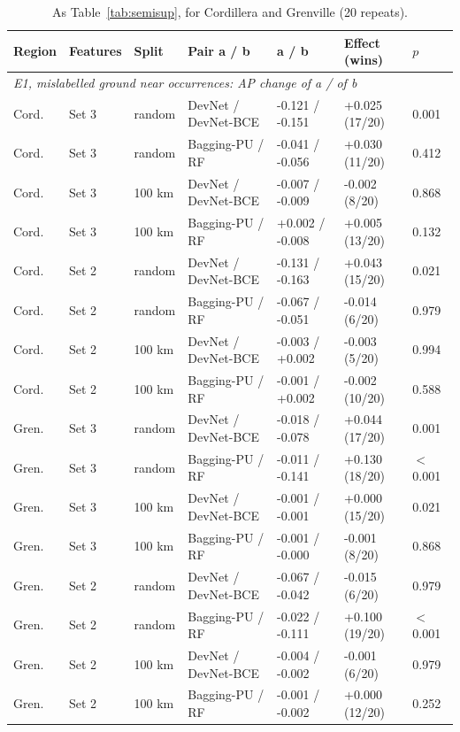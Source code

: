 \documentclass[pdflatex,sn-apa]{sn-jnl}
\begin{document}
\begin{appendices}
\begin{table}[!h]
\caption{As Table~\ref{tab:semisup}, for Cordillera and Grenville (20 repeats).}\label{tab:semisup-regions}
\scriptsize
\setlength{\tabcolsep}{2pt}
\begin{tabular*}{\textwidth}{@{\extracolsep\fill}lllllll}
\toprule
Region & Features & Split & Pair a / b & a / b & Effect (wins) & $p$ \\
\midrule
\multicolumn{7}{l}{\textit{E1, mislabelled ground near occurrences: AP change of a / of b}} \\
Cord. & Set 3 & random & DevNet / DevNet-BCE & -0.121 / -0.151 & +0.025 (17/20) & 0.001 \\
Cord. & Set 3 & random & Bagging-PU / RF & -0.041 / -0.056 & +0.030 (11/20) & 0.412 \\
Cord. & Set 3 & 100 km & DevNet / DevNet-BCE & -0.007 / -0.009 & -0.002 (8/20) & 0.868 \\
Cord. & Set 3 & 100 km & Bagging-PU / RF & +0.002 / -0.008 & +0.005 (13/20) & 0.132 \\
Cord. & Set 2 & random & DevNet / DevNet-BCE & -0.131 / -0.163 & +0.043 (15/20) & 0.021 \\
Cord. & Set 2 & random & Bagging-PU / RF & -0.067 / -0.051 & -0.014 (6/20) & 0.979 \\
Cord. & Set 2 & 100 km & DevNet / DevNet-BCE & -0.003 / +0.002 & -0.003 (5/20) & 0.994 \\
Cord. & Set 2 & 100 km & Bagging-PU / RF & -0.001 / +0.002 & -0.002 (10/20) & 0.588 \\
Gren. & Set 3 & random & DevNet / DevNet-BCE & -0.018 / -0.078 & +0.044 (17/20) & 0.001 \\
Gren. & Set 3 & random & Bagging-PU / RF & -0.011 / -0.141 & +0.130 (18/20) & $<$0.001 \\
Gren. & Set 3 & 100 km & DevNet / DevNet-BCE & -0.001 / -0.001 & +0.000 (15/20) & 0.021 \\
Gren. & Set 3 & 100 km & Bagging-PU / RF & -0.001 / -0.000 & -0.001 (8/20) & 0.868 \\
Gren. & Set 2 & random & DevNet / DevNet-BCE & -0.067 / -0.042 & -0.015 (6/20) & 0.979 \\
Gren. & Set 2 & random & Bagging-PU / RF & -0.022 / -0.111 & +0.100 (19/20) & $<$0.001 \\
Gren. & Set 2 & 100 km & DevNet / DevNet-BCE & -0.004 / -0.002 & -0.001 (6/20) & 0.979 \\
Gren. & Set 2 & 100 km & Bagging-PU / RF & -0.001 / -0.002 & +0.000 (12/20) & 0.252 \\

\end{tabular*}
\end{table}
\end{appendices}
\end{document}
